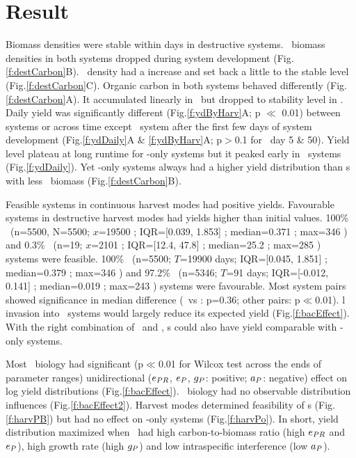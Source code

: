 \documentclass[../thesis.tex]{subfiles} %
\begin{document}
\section{Result}
Biomass densities were stable within days in destructive systems.  \Phy\ biomass densities in both systems dropped during system development (Fig.\ref{f:destCarbon}B).  \Bac\ density had a increase and set back a little to the stable level (Fig.\ref{f:destCarbon}C).  Organic carbon in both systems behaved differently (Fig.\ref{f:destCarbon}A).  It accumulated linearly in \PoN\ but dropped to stability level in \PBN.  Daily yield was significantly different (Fig.\ref{f:ydByHarv}A; p $\ll$ 0.01) between systems or across time except \PoN\ system after the first few days of system development (Fig.\ref{f:ydDaily}A \& \ref{f:ydByHarv}A; p$>$0.1 for \PoN\ day 5 \& 50).  Yield level plateau at long runtime for \phy-only systems but it peaked early in \PBN\ systems (Fig.\ref{f:ydDaily}).  Yet \phy-only systems always had a higher yield distribution than \pbs s with less \phy\ biomass (Fig.\ref{f:destCarbon}B).

Feasible systems in continuous harvest modes had positive yields.  Favourable systems in destructive harvest modes had yields higher than initial values.  100\% \PoH\ (n=5500, N=5500; $x$=19500 \dayU; IQR=[0.039, 1.853] \dxdt; median=0.371 \dxdt; max=346 \dxdt) and 0.3\% \PBH\ (n=19; $x$=2101 \dayU; IQR=[12.4, 47.8] \dxdt; median=25.2 \dxdt; max=285 \dxdt) systems were feasible.  100\% \PoN\ (n=5500; $T$=19900 days; IQR=[0.045, 1.851] \dxdt; median=0.379 \dxdt; max=346 \dxdt) and 97.2\% \PBN\ (n=5346; $T$=91 days; IQR=[-0.012, 0.141] \dxdt; median=0.019 \dxdt; max=243 \dxdt) systems were favourable.  Most system pairs showed significance in median difference (\PoH\ vs \PoN: p=0.36; other pairs: p$\ll$0.01).  \Bac l invasion into \PoN\ systems would largely reduce its expected yield (Fig.\ref{f:bacEffect}).  With the right combination of \phy\ and \bac, \pbs s could also have yield comparable with \phy-only systems.

Most \phy\ biology had significant (p$\ll$0.01 for Wilcox test across the ends of parameter ranges) unidirectional ($e_{PR}$, $e_P$, $g_P$: positive; $a_P$: negative) effect on log yield distributions (Fig.\ref{f:bacEffect}).  \Bac\ biology had no observable distribution influences (Fig.\ref{f:bacEffect2}).  Harvest modes determined feasibility of \pbs s (Fig.\ref{f:harvPB}) but had no effect on \phy-only systems (Fig.\ref{f:harvPo}).  In short, yield distribution maximized when \phy\ had high carbon-to-biomass ratio (high $e_{PR}$ and $e_P$), high growth rate (high $g_P$) and low intraspecific interference (low $a_P$).
\end{document}
